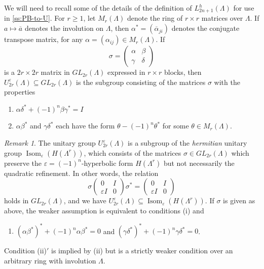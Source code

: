\documentclass[11pt,a4paper,leqno]{amsart}
\theoremstyle{definition}
\theoremstyle{remark}
\newtheorem{remark}[theorem]{Remark}
\newcommand{\ol}{\overline}
\DeclareMathOperator{\Isom}{Isom}
\renewcommand{\l}{\Lambda}
\newcommand{\La}{\Lambda}
\newcommand{\wbar}[1]{\overline{#1} }
\newcommand{\ep}{\varepsilon}
\newcommand{\U}{U^{\varepsilon}}
\begin{document}
We will need to recall some of the details  of the definition of   $L^h_{2n+1}(\La)$ for use in \cref{ss:PB-to-U}.  For $r \ge 1$, let $M_r(\l)$ denote the ring of $r \times r$ matrices over $\l$.  If $a \mapsto \ol{a}$ denotes the involution on $\La$, then  $\alpha^* = (\wbar{\alpha}_{ji}) $ denotes the conjugate transpose matrix, for any $\alpha =(\alpha_{ij}) \in M_{r}(\La)$. If
\[\sigma = \left(\begin{smallmatrix} \alpha & \beta \\ \gamma & \delta \end{smallmatrix}\right) \]
is a $2r\times 2r$ matrix in $GL_{2r}(\La)$ expressed in $r\times r$ blocks, then
$\U_{2r}(\La) \subseteq GL_{2r}(\La)$ is the subgroup consisting of the matrices $\sigma$ with the properties
\begin{enumerate}
\item $\alpha \delta^* + (-1)^n\beta \gamma^* = I$
\item $\alpha\beta^*$ and $\gamma \delta^*$ each have the form 
$\theta - (-1)^n\theta^*$ for some  $\theta \in M_r(\l)$.
\end{enumerate}

\begin{remark} \label{remark:unitary-definitions} 
The unitary group $\U_{2r}(\La)$
  is a subgroup of the \emph{hermitian} unitary group
$ \Isom_\ep(H(\La^r))$, which consists of the matrices $\sigma \in GL_{2r}(\l)$ which preserve the $\varepsilon = (-1)^n$-hyperbolic form $H(\l^r)$ but not necessarily the quadratic refinement. In  other words, the relation
\[ \sigma \left(\begin{smallmatrix} 0 & I \\ \ep I & 0 \end{smallmatrix}\right) \sigma^* = \left(\begin{smallmatrix} 0 & I \\ \ep I & 0 \end{smallmatrix}\right)\]
holds in $GL_{2r}(\l)$, and we have $\U_{2r}(\l)\subseteq \Isom_\ep(H(\La^r))$. If $\sigma$ is given as above, the weaker assumption is equivalent to conditions (i) and 
\begin{enumerate}
	\item[(ii)$'$] $(\alpha \beta^*)^* + (-1)^{n}\alpha \beta^*=0$ and $(\gamma \delta^*)^*+ (-1)^{n}\gamma \delta^*=0$.
\end{enumerate}
Condition (ii)$'$ is implied by (ii) but is a strictly weaker condition over an arbitrary ring with involution $\La$.
\end{remark}
\end{document}
